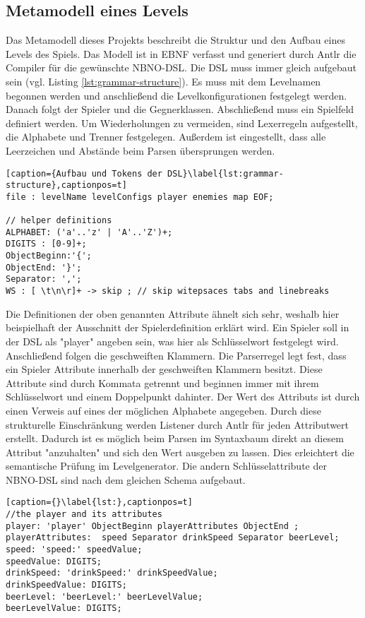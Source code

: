 \subsection{Metamodell eines Levels}
Das Metamodell dieses Projekts beschreibt die Struktur und den Aufbau eines Levels des Spiels. Das Modell ist in EBNF verfasst und generiert durch Antlr die Compiler für die gewünschte NBNO-DSL.\newline
Die DSL muss immer gleich aufgebaut sein (vgl. Listing \ref{lst:grammar-structure}). Es muss mit dem Levelnamen begonnen werden und anschließend die Levelkonfigurationen festgelegt werden. Danach folgt der Spieler und die Gegnerklassen. Abschließend muss ein Spielfeld definiert werden.\newline
Um Wiederholungen zu vermeiden, sind Lexerregeln aufgestellt, die Alphabete und Trenner festgelegen.
Außerdem ist eingestellt, dass alle Leerzeichen und Abstände beim Parsen übersprungen werden.
\begin{lstlisting}[caption={Aufbau und Tokens der DSL}\label{lst:grammar-structure},captionpos=t] 
file : levelName levelConfigs player enemies map EOF;

// helper definitions
ALPHABET: ('a'..'z' | 'A'..'Z')+;
DIGITS : [0-9]+;
ObjectBeginn:'{';
ObjectEnd: '}';
Separator: ',';
WS : [ \t\n\r]+ -> skip ; // skip witepsaces tabs and linebreaks
\end{lstlisting}
 
Die Definitionen der oben genannten Attribute ähnelt sich sehr, weshalb hier beispielhaft der Ausschnitt der Spielerdefinition erklärt wird. Ein Spieler soll in der DSL als "player" angeben sein, was hier als Schlüsselwort festgelegt wird. Anschließend folgen die geschweiften Klammern. Die Parserregel legt fest, dass ein Spieler Attribute innerhalb der geschweiften Klammern besitzt. Diese Attribute sind durch Kommata getrennt und beginnen immer mit ihrem Schlüsselwort und einem Doppelpunkt dahinter. \newline
Der Wert des Attributs ist durch einen Verweis auf eines der möglichen Alphabete angegeben. Durch diese strukturelle Einschränkung werden Listener durch Antlr für jeden Attributwert erstellt. Dadurch ist es möglich beim Parsen im Syntaxbaum direkt an diesem Attribut "anzuhalten" und sich den Wert ausgeben zu lassen. Dies erleichtert die semantische Prüfung im Levelgenerator. Die andern Schlüsselattribute der NBNO-DSL sind nach dem gleichen Schema aufgebaut. 
\begin{lstlisting}[caption={}\label{lst:},captionpos=t] 
//the player and its attributes
player: 'player' ObjectBeginn playerAttributes ObjectEnd ;
playerAttributes:  speed Separator drinkSpeed Separator beerLevel;
speed: 'speed:' speedValue;
speedValue: DIGITS;
drinkSpeed: 'drinkSpeed:' drinkSpeedValue;
drinkSpeedValue: DIGITS;
beerLevel: 'beerLevel:' beerLevelValue;
beerLevelValue: DIGITS;
\end{lstlisting}

